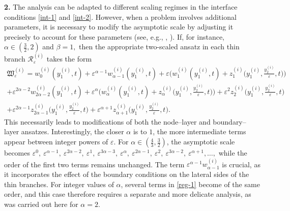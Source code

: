 \documentclass[reqno]{amsart}            %
\numberwithin{equation}{section}
\begin{document}
	
	
	\smallskip 
	
	\textbf{2.} The analysis can be adapted to different scaling regimes in the interface conditions \eqref{int-1} and \eqref{int-2}. However, when a problem involves additional parameters, it is necessary to modify the asymptotic scale by adjusting it precisely to account for these
	parameters (see, e.g., \cite{Mel-AA-2021,Mel-Roh_JMAA-2024},
	\cite[Sect.~6]{Mel-Roh_Non-Diff-2024}).
	If, for instance, $\alpha\in(\tfrac{3}{2},2)$ and $\beta =1,$ then the appropriate two-scaled ansatz in each thin branch $\mathcal{R}^{(i)}_\varepsilon$ takes the form
	\begin{multline}\label{reg-1}
		\mathfrak{W}^{(i)}_\varepsilon =
		w_0^{(i)}(y^{(i)}_1,t)
		+ \varepsilon^{\alpha-1} w_{\alpha-1}^{(i)}(y^{(i)}_1,t)
		+ \varepsilon\Big(
		w_1^{(i)}(y^{(i)}_1,t)
		+ z_1^{(i)}\big(y^{(i)}_1,\tfrac{y^{(i)}_2}{\varepsilon},t\big)
		\Big)
		\\
		+ \varepsilon^{2\alpha-2} w_{2\alpha-2}^{(i)}(y^{(i)}_1,t)
		+ \varepsilon^\alpha\Big(
		w_\alpha^{(i)}(y^{(i)}_1,t)
		+ z_\alpha^{(i)}\big(y^{(i)}_1,\tfrac{y^{(i)}_2}{\varepsilon},t\big)
		\Big)
		+ \varepsilon^2 z_2^{(i)}\big(y^{(i)}_1,\tfrac{y^{(i)}_2}{\varepsilon},t\big)
		\\
		+ \varepsilon^{2\alpha-1} z_{2\alpha-1}^{(i)}\big(y^{(i)}_1,\tfrac{y^{(i)}_2}{\varepsilon},t\big)
		+ \varepsilon^{\alpha+1} z_{\alpha+1}^{(i)}\big(y^{(i)}_1,\tfrac{y^{(i)}_2}{\varepsilon},t\big).
	\end{multline}
	This necessarily leads to modifications of both the node–layer and
	boundary–layer ansatzes. Interestingly, the closer $\alpha$ is to $1$, the more
	intermediate terms appear between integer powers of $\varepsilon$. For
	$\alpha\in(\tfrac{4}{3},\tfrac{3}{2})$, the asymptotic scale becomes
	$
	\varepsilon^0, \ \varepsilon^{\alpha -1}, \  \varepsilon^{2\alpha -2},  \  \varepsilon^1, \  \varepsilon^{3\alpha -3},\  \varepsilon^{\alpha}, \  \varepsilon^{2\alpha -1}, \  \varepsilon^2, \  \varepsilon^{3\alpha -2}, \ \varepsilon^{\alpha +1},\ldots,
	$
	while the order of the first two terms  remains unchanged.  The term
	$\varepsilon^{\alpha-1} w_{\alpha-1}^{(i)}$ is crucial, as it incorporates the
	effect of the boundary conditions on the lateral sides of the thin branches.
	For integer values of $\alpha$, several terms in \eqref{reg-1} become of the
	same order, and this case therefore requires a separate and more delicate
	analysis, as was carried out here for $\alpha=2$.
	
\end{document}
